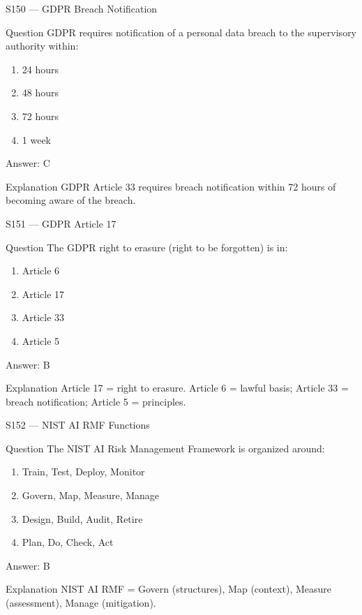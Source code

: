 \documentclass[aspectratio=169,8pt]{beamer}
\begin{document}
	\begin{frame}{S150 --- GDPR Breach Notification}
		\begin{block}{Question}
			GDPR requires notification of a personal data breach to the supervisory authority within:
			\begin{enumerate}
				\item 24 hours
				\item 48 hours
				\item 72 hours
				\item 1 week
			\end{enumerate}
		\end{block}
		\begin{exampleblock}{Answer: C}\end{exampleblock}
		\begin{block}{Explanation}
			GDPR Article 33 requires breach notification within 72 hours of becoming aware of the breach.
		\end{block}
	\end{frame}
	
	\begin{frame}{S151 --- GDPR Article 17}
		\begin{block}{Question}
			The GDPR right to erasure (right to be forgotten) is in:
			\begin{enumerate}
				\item Article 6
				\item Article 17
				\item Article 33
				\item Article 5
			\end{enumerate}
		\end{block}
		\begin{exampleblock}{Answer: B}\end{exampleblock}
		\begin{block}{Explanation}
			Article 17 = right to erasure. Article 6 = lawful basis; Article 33 = breach notification; Article 5 = principles.
		\end{block}
	\end{frame}
	
	\begin{frame}{S152 --- NIST AI RMF Functions}
		\begin{block}{Question}
			The NIST AI Risk Management Framework is organized around:
			\begin{enumerate}
				\item Train, Test, Deploy, Monitor
				\item Govern, Map, Measure, Manage
				\item Design, Build, Audit, Retire
				\item Plan, Do, Check, Act
			\end{enumerate}
		\end{block}
		\begin{exampleblock}{Answer: B}\end{exampleblock}
		\begin{block}{Explanation}
			NIST AI RMF = Govern (structures), Map (context), Measure (assessment), Manage (mitigation).
		\end{block}
	\end{frame}
	
\end{document}
